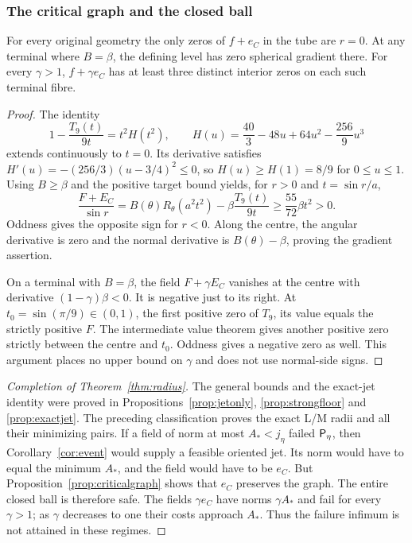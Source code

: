 \documentclass[11pt,a4paper]{article}
\begin{document}
\subsubsection{The critical graph and the closed ball}
\begin{proposition}\label{prop:criticalgraph}
For every original geometry the only zeros of $f+e_C$ in the
tube are $r=0$. At any terminal where $B=\beta$, the defining
level has zero spherical gradient there. For every $\gamma>1$,
$f+\gamma e_C$ has at least three distinct interior zeros on
each such terminal fibre.
\end{proposition}
\begin{proof}
The identity
\[
 1-\frac{T_9(t)}{9t}=t^2H(t^2),\qquad
 H(u)=\frac{40}{3}-48u+64u^2-\frac{256}{9}u^3
\]
extends continuously to $t=0$. Its derivative satisfies
$H'(u)=-(256/3)(u-3/4)^2\le0$, so
$H(u)\ge H(1)=8/9$ for $0\le u\le1$.
Using $B\ge\beta$ and the positive target bound yields, for
$r>0$ and $t=\sin r/a$,
\begin{equation}\label{eq:criticalsign}
 \frac{F+E_C}{\sin r}
 =B(\theta)R_\theta(a^2t^2)
       -\beta\frac{T_9(t)}{9t}
 \ge\frac{55}{72}\beta t^2>0.
\end{equation}
Oddness gives the opposite sign for $r<0$. Along the centre,
the angular derivative is zero and the normal derivative is
$B(\theta)-\beta$, proving the gradient assertion.

On a terminal with $B=\beta$, the field $F+\gamma E_C$
vanishes at the centre with derivative $(1-\gamma)\beta<0$.
It is negative just to its right. At
$t_0=\sin(\pi/9)\in(0,1)$, the first positive zero of $T_9$,
its value equals the strictly positive $F$.
The intermediate value theorem gives another positive zero
strictly between the centre and $t_0$. Oddness gives a
negative zero as well. This argument places no upper bound on
$\gamma$ and does not use normal-side signs.
\end{proof}

\begin{proof}[Completion of Theorem~\ref{thm:radius}]
The general bounds and the exact-jet identity were proved in
Propositions~\ref{prop:jetonly}, \ref{prop:strongfloor} and
\ref{prop:exactjet}. The preceding classification proves the
exact L/M radii and all their minimizing pairs.
If a field of norm at most $A_*<j_\eta$ failed $\mathsf P_\eta$, then
Corollary~\ref{cor:event} would supply a feasible oriented jet.
Its norm would have to equal the minimum $A_*$, and the field
would have to be $e_C$. But Proposition~\ref{prop:criticalgraph}
shows that $e_C$ preserves the graph. The entire closed ball
is therefore safe. The fields $\gamma e_C$ have norms
$\gamma A_*$ and fail for every $\gamma>1$; as $\gamma$
decreases to one their costs approach $A_*$.
Thus the failure infimum is not attained in these regimes.
\end{proof}
\end{document}
